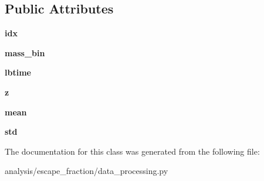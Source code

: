\subsection*{Public Attributes}
\begin{DoxyCompactItemize}
\item 
\hypertarget{classseren3_1_1analysis_1_1escape__fraction_1_1data__processing_1_1MassBin_a630f0daa707b89d910f6f6b7e35972cb}{
{\bfseries idx}}
\label{classseren3_1_1analysis_1_1escape__fraction_1_1data__processing_1_1MassBin_a630f0daa707b89d910f6f6b7e35972cb}

\item 
\hypertarget{classseren3_1_1analysis_1_1escape__fraction_1_1data__processing_1_1MassBin_a29b46526f6002c54de7ce9348433bf4f}{
{\bfseries mass\_\-bin}}
\label{classseren3_1_1analysis_1_1escape__fraction_1_1data__processing_1_1MassBin_a29b46526f6002c54de7ce9348433bf4f}

\item 
\hypertarget{classseren3_1_1analysis_1_1escape__fraction_1_1data__processing_1_1MassBin_aa3bc5ddbbd9cf4f286b32166db6e4ae3}{
{\bfseries lbtime}}
\label{classseren3_1_1analysis_1_1escape__fraction_1_1data__processing_1_1MassBin_aa3bc5ddbbd9cf4f286b32166db6e4ae3}

\item 
\hypertarget{classseren3_1_1analysis_1_1escape__fraction_1_1data__processing_1_1MassBin_afe1bcef5871663e121b0b4a994c9e0ca}{
{\bfseries z}}
\label{classseren3_1_1analysis_1_1escape__fraction_1_1data__processing_1_1MassBin_afe1bcef5871663e121b0b4a994c9e0ca}

\item 
\hypertarget{classseren3_1_1analysis_1_1escape__fraction_1_1data__processing_1_1MassBin_afb710333127947de79d6656f65da7656}{
{\bfseries mean}}
\label{classseren3_1_1analysis_1_1escape__fraction_1_1data__processing_1_1MassBin_afb710333127947de79d6656f65da7656}

\item 
\hypertarget{classseren3_1_1analysis_1_1escape__fraction_1_1data__processing_1_1MassBin_a78a2ee846ef0ad23c9d075a1ed47d326}{
{\bfseries std}}
\label{classseren3_1_1analysis_1_1escape__fraction_1_1data__processing_1_1MassBin_a78a2ee846ef0ad23c9d075a1ed47d326}

\end{DoxyCompactItemize}


The documentation for this class was generated from the following file:\begin{DoxyCompactItemize}
\item 
analysis/escape\_\-fraction/data\_\-processing.py\end{DoxyCompactItemize}
